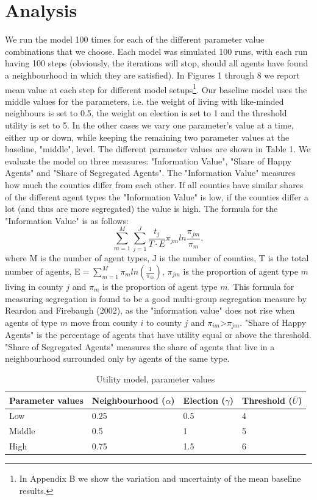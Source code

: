 \documentclass[12pt, a4paper]{article}
\begin{document}
	\section{\label{sec_res}Analysis}
	We run the model 100 times for each of the different parameter value combinations that we choose. Each model was simulated 100 runs, with each run having 100 steps (obviously, the iterations will stop, should all agents have found a neighbourhood in which they are satisfied). In Figures 1 through 8 we report mean value at each step for different model setups\footnote{In Appendix B we show the variation and uncertainty of the mean baseline results.}. Our baseline model uses the middle values for the parameters, i.e. the weight of living with like-minded neighbours is set to 0.5, the weight on election is set to 1 and the threshold utility is set to 5. In the other cases we vary one parameter's value at a time, either up or down, while keeping the remaining two parameter values at the baseline, "middle", level. The different parameter values are shown in Table 1. We evaluate the model on three measures: "Information Value", "Share of Happy Agents" and "Share of Segregated Agents". The "Information Value" measures how much the counties differ from each other. If all counties have similar shares of the different agent types the "Information Value" is low, if the counties differ a lot (and thus are more segregated) the value is high. The formula for the "Information Value" is as follows: \newline
	$$\sum_{m=1}^{M}\sum_{j=1}^{J}\frac{t_j}{T \cdot E}\pi_{jm}ln\frac{\pi_{jm}}{\pi_m},$$ where M is the number of agent types, J is the number of counties, T is the total number of agents, E$=\sum_{m=1}^{M}\pi_m ln(\frac{1}{\pi_m})$, $\pi_{jm}$ is the proportion of agent type $m$ living in county $j$ and $\pi_m$ is the proportion of agent type $m$. This formula for measuring segregation is found to be a good multi-group segregation measure by Reardon and Firebaugh (2002), as the "information value" does not rise when agents of type $m$ move from county $i$ to county $j$ and $\pi_{im}$\textgreater$\pi_{jm}$. "Share of Happy Agents" is the percentage of agents that have utility equal or above the threshold. "Share of Segregated Agents" measures the share of agents that live in a neighbourhood surrounded only by agents of the same type.
	
	\begin{table}[ht]
		\centering
		\caption{Utility model, parameter values}
		\begin{tabular}{llll}
			\hline
			Parameter values & Neighbourhood ($\alpha$) & Election ($\gamma$) & Threshold ($\bar{U}$) \\ 
			\hline \hline
			Low & 0.25 & 0.5 & 4 \\ 
			Middle & 0.5 & 1 & 5 \\ 
			High & 0.75 & 1.5 & 6 \\ \hline
			\hline
		\end{tabular}
	\end{table}
	
\end{document}
